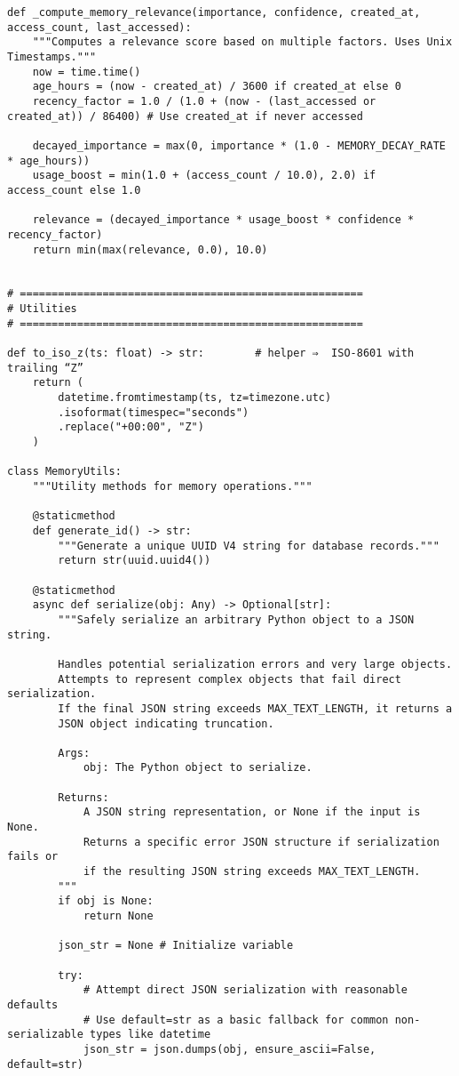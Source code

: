 \documentclass[12pt,a4paper]{article}
\begin{document}
\begin{pageablecode}
\begin{verbatim}
def _compute_memory_relevance(importance, confidence, created_at, access_count, last_accessed):
    """Computes a relevance score based on multiple factors. Uses Unix Timestamps."""
    now = time.time()
    age_hours = (now - created_at) / 3600 if created_at else 0
    recency_factor = 1.0 / (1.0 + (now - (last_accessed or created_at)) / 86400) # Use created_at if never accessed

    decayed_importance = max(0, importance * (1.0 - MEMORY_DECAY_RATE * age_hours))
    usage_boost = min(1.0 + (access_count / 10.0), 2.0) if access_count else 1.0

    relevance = (decayed_importance * usage_boost * confidence * recency_factor)
    return min(max(relevance, 0.0), 10.0)


# ======================================================
# Utilities
# ======================================================

def to_iso_z(ts: float) -> str:        # helper ⇒  ISO‑8601 with trailing “Z”
    return (
        datetime.fromtimestamp(ts, tz=timezone.utc)
        .isoformat(timespec="seconds")
        .replace("+00:00", "Z")
    )

class MemoryUtils:
    """Utility methods for memory operations."""

    @staticmethod
    def generate_id() -> str:
        """Generate a unique UUID V4 string for database records."""
        return str(uuid.uuid4())

    @staticmethod
    async def serialize(obj: Any) -> Optional[str]:
        """Safely serialize an arbitrary Python object to a JSON string.

        Handles potential serialization errors and very large objects.
        Attempts to represent complex objects that fail direct serialization.
        If the final JSON string exceeds MAX_TEXT_LENGTH, it returns a
        JSON object indicating truncation.

        Args:
            obj: The Python object to serialize.

        Returns:
            A JSON string representation, or None if the input is None.
            Returns a specific error JSON structure if serialization fails or
            if the resulting JSON string exceeds MAX_TEXT_LENGTH.
        """
        if obj is None:
            return None

        json_str = None # Initialize variable

        try:
            # Attempt direct JSON serialization with reasonable defaults
            # Use default=str as a basic fallback for common non-serializable types like datetime
            json_str = json.dumps(obj, ensure_ascii=False, default=str)


\end{verbatim}
\end{pageablecode}
\end{document}
